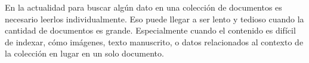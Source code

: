 \documentclass[../main.tex]{subfiles}
\begin{document}

%
%
%



En la actualidad para buscar algún dato en una colección de documentos es necesario leerlos individualmente.
Eso puede llegar a ser lento y tedioso cuando la cantidad de documentos es grande.
Especialmente cuando el contenido es difícil de indexar,
cómo imágenes,
texto manuscrito,
o datos relacionados al contexto de la colección en lugar en un solo documento.
\end{document}
